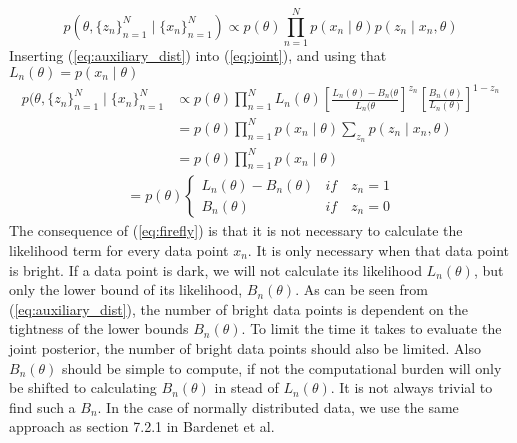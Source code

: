 \documentclass{article}
\theoremstyle{definition}
\begin{document}
\begin{equation}\label{eq:joint}
           p(\theta, \{z_n\}_{n=1}^N \mid \{x_n\}_{n=1}^N) \propto p(\theta) \prod_{n=1}^N p(x_n\mid\theta)p(z_n\mid x_n, \theta)
\end{equation}
Inserting (\ref{eq:auxiliary_dist}) into (\ref{eq:joint}), and using that $L_n(\theta) = p(x_n\mid\theta)$
\begin{equation}
\begin{split}
     p(\theta, \{z_n\}_{n=1}^N\mid\{x_n\}_{n=1}^N &\propto p(\theta) \prod_{n=1}^N L_n(\theta)\left[\frac{L_n(\theta) - B_n(\theta}{L_n(\theta}\right]^{z_n}\left[\frac{B_n(\theta)}{L_n(\theta)}\right]^{1-z_n} \\
     &= p(\theta) \prod_{n=1}^N p\left(x_n\mid\theta\right)\sum_{z_n} p\left(z_n\mid x_n, \theta\right)
     \\
     &= p(\theta) \prod_{n=1}^N p\left(x_n\mid\theta\right)
\end{split}
\end{equation}
\begin{equation}
\label{eq:firefly}
\begin{split}
     =p(\theta)
     \begin{cases}
        L_n(\theta) - B_n(\theta) & if \quad z_n = 1 \\
        B_n(\theta) & if \quad z_n = 0
     \end{cases}
\end{split}
\end{equation}
The consequence of (\ref{eq:firefly}) is that it is not necessary to calculate the likelihood term for every data point $x_n$. It is only necessary when that data point is bright. If a data point is dark, we will not calculate its likelihood $L_n(\theta)$, but only the lower bound of its likelihood, $B_n(\theta)$. 
As can be seen from (\ref{eq:auxiliary_dist}), the number of bright data points is dependent on the tightness of the lower bounds $B_n(\theta)$. To limit the time it takes to evaluate the joint posterior, the number of bright data points should also be limited. Also $B_n(\theta)$ should be simple to compute, if not the computational burden will only be shifted to calculating $B_n(\theta)$ in stead of $L_n(\theta)$. 
It is not always trivial to find such a $B_n$. In the case of normally distributed data, we use the same approach as section 7.2.1 in Bardenet et al.
\end{document}
